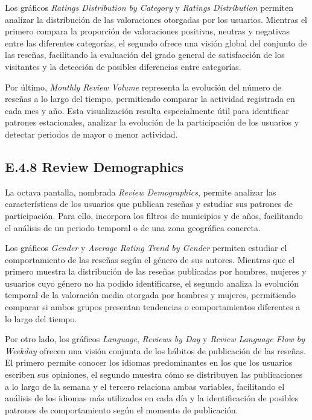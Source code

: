 Los gráficos \textit{Ratings Distribution by Category} y \textit{Ratings Distribution} permiten analizar la distribución de las valoraciones otorgadas por los usuarios. Mientras el primero compara la proporción de valoraciones positivas, neutras y negativas entre las diferentes categorías, el segundo ofrece una visión global del conjunto de las reseñas, facilitando la evaluación del grado general de satisfacción de los visitantes y la detección de posibles diferencias entre categorías.

Por último, \textit{Monthly Review Volume} representa la evolución del número de reseñas a lo largo del tiempo, permitiendo comparar la actividad registrada en cada mes y año. Esta visualización resulta especialmente útil para identificar patrones estacionales, analizar la evolución de la participación de los usuarios y detectar periodos de mayor o menor actividad.


\subsection{E.4.8 Review Demographics}
La octava pantalla, nombrada \textit{Review Demographics}, permite analizar las características de los usuarios que publican reseñas y estudiar sus patrones de participación. Para ello, incorpora los filtros de municipios y de años, facilitando el análisis de un periodo temporal o de una zona geográfica concreta.

Los gráficos \textit{Gender} y \textit{Average Rating Trend by Gender} permiten estudiar el comportamiento de las reseñas según el género de sus autores. Mientras que el primero muestra la distribución de las reseñas publicadas por hombres, mujeres y usuarios cuyo género no ha podido identificarse, el segundo analiza la evolución temporal de la valoración media otorgada por hombres y mujeres, permitiendo comparar si ambos grupos presentan tendencias o comportamientos diferentes a lo largo del tiempo.

Por otro lado, los gráficos \textit{Language}, \textit{Reviews by Day} y \textit{Review Language Flow by Weekday} ofrecen una visión conjunta de los hábitos de publicación de las reseñas. El primero permite conocer los idiomas predominantes en los que los usuarios escriben sus opiniones, el segundo muestra cómo se distribuyen las publicaciones a lo largo de la semana y el tercero relaciona ambas variables, facilitando el análisis de los idiomas más utilizados en cada día y la identificación de posibles patrones de comportamiento según el momento de publicación.

